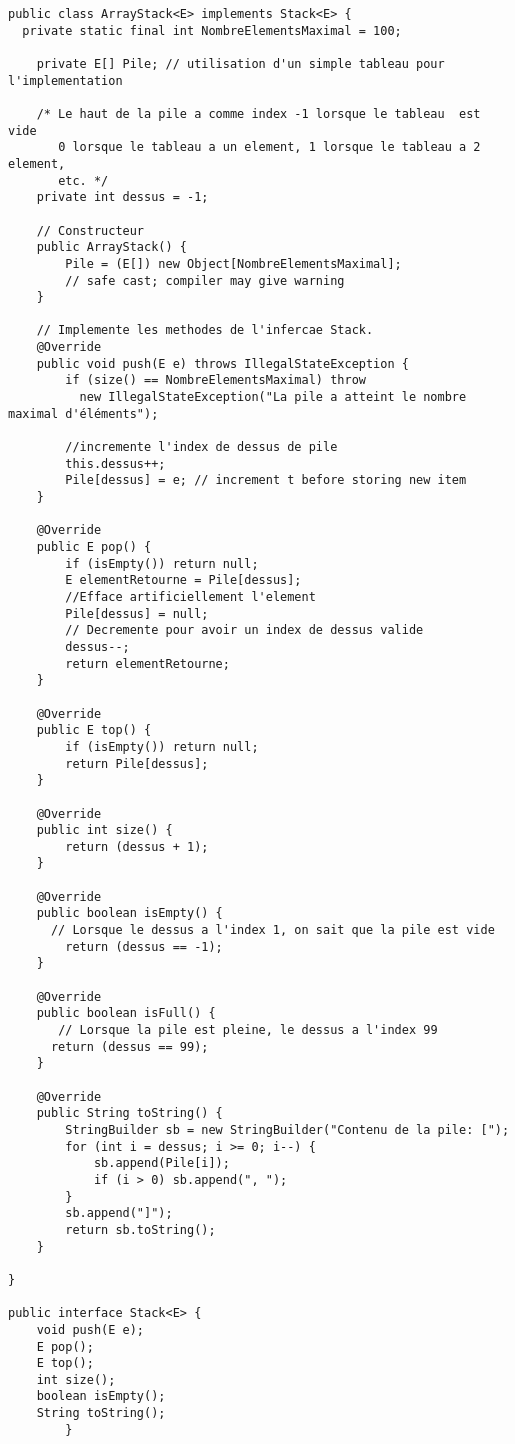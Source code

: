 \documentclass[9pt]{report}
\begin{document}
    \begin{lstlisting}[style=JavaDraculaWhite]
public class ArrayStack<E> implements Stack<E> {
  private static final int NombreElementsMaximal = 100;

    private E[] Pile; // utilisation d'un simple tableau pour l'implementation
    
    /* Le haut de la pile a comme index -1 lorsque le tableau  est vide 
       0 lorsque le tableau a un element, 1 lorsque le tableau a 2 element, 
       etc. */
    private int dessus = -1; 

    // Constructeur
    public ArrayStack() {
        Pile = (E[]) new Object[NombreElementsMaximal]; 
        // safe cast; compiler may give warning
    }

    // Implemente les methodes de l'infercae Stack.
    @Override
    public void push(E e) throws IllegalStateException {
        if (size() == NombreElementsMaximal) throw 
          new IllegalStateException("La pile a atteint le nombre maximal d'éléments");

        //incremente l'index de dessus de pile
        this.dessus++; 
        Pile[dessus] = e; // increment t before storing new item
    }

    @Override
    public E pop() {
        if (isEmpty()) return null;
        E elementRetourne = Pile[dessus];
        //Efface artificiellement l'element
        Pile[dessus] = null;
        // Decremente pour avoir un index de dessus valide
        dessus--;
        return elementRetourne;
    }

    @Override
    public E top() {
        if (isEmpty()) return null;
        return Pile[dessus];
    }

    @Override
    public int size() {
        return (dessus + 1);
    }

    @Override
    public boolean isEmpty() {
      // Lorsque le dessus a l'index 1, on sait que la pile est vide
        return (dessus == -1);
    }

    @Override 
    public boolean isFull() {
       // Lorsque la pile est pleine, le dessus a l'index 99
      return (dessus == 99);
    }

    @Override
    public String toString() {
        StringBuilder sb = new StringBuilder("Contenu de la pile: [");
        for (int i = dessus; i >= 0; i--) {
            sb.append(Pile[i]);
            if (i > 0) sb.append(", ");
        }
        sb.append("]");
        return sb.toString();
    }
  
}

public interface Stack<E> {
    void push(E e);
    E pop();
    E top();
    int size();
    boolean isEmpty();
    String toString();
        }
    \end{lstlisting}
\end{document}
